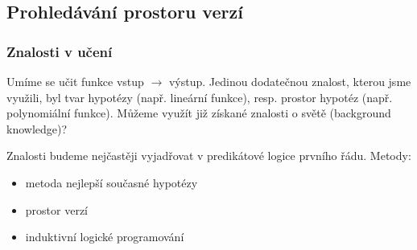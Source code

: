 \documentclass[11pt]{report} %
\numberwithin{equation}{section}
\begin{document}
\subsection{Prohledávání prostoru verzí}
\subsubsection{Znalosti v učení}
Umíme se učit funkce vstup $\to$ výstup. Jedinou dodatečnou znalost, kterou jsme využili, byl tvar hypotézy (např. lineární funkce), resp. prostor hypotéz (např. polynomiální funkce). Můžeme využít již získané znalosti o světě (background knowledge)? 

Znalosti budeme nejčastěji vyjadřovat v predikátové logice prvního řádu.
Metody:
\begin{itemize}
\item metoda nejlepší současné hypotézy
\item prostor verzí
\item induktivní logické programování
\end{itemize}
\end{document}
